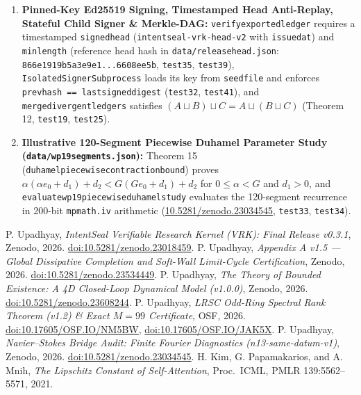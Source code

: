 \documentclass[10pt,letterpaper]{article}
\renewcommand{\_}{\textunderscore\allowbreak{}}
\begin{document}
\begin{enumerate}
  \item \textbf{Pinned-Key Ed25519 Signing, Timestamped Head Anti-Replay, Stateful Child Signer \& Merkle-DAG:} \texttt{verify\_exported\_ledger} requires a timestamped \texttt{signed\_head} (\texttt{intentseal-vrk-head-v2} with \texttt{issued\_at}) and \texttt{min\_length} (reference head hash in \texttt{data/release\_head.json}: \texttt{866e1919b5a3e9e1...6608ee5b}, \texttt{test\_35}, \texttt{test\_39}), \texttt{IsolatedSignerSubprocess} loads its key from \texttt{seed\_file} and enforces \texttt{prev\_hash == last\_signed\_digest} (\texttt{test\_32}, \texttt{test\_41}), and \texttt{merge\_divergent\_ledgers} satisfies $(A \sqcup B) \sqcup C = A \sqcup (B \sqcup C)$ (Theorem 12, \texttt{test\_19}, \texttt{test\_25}).
  \item \textbf{Illustrative 120-Segment Piecewise Duhamel Parameter Study (\texttt{data/wp19\_segments.json}):} Theorem 15 (\texttt{duhamel\_piecewise\_contraction\_bound}) proves $\alpha(\alpha e_0 + d_1) + d_2 < G(G e_0 + d_1) + d_2$ for $0 \le \alpha < G$ and $d_1 > 0$, and \texttt{evaluate\_wp19\_piecewise\_duhamel\_study} evaluates the 120-segment recurrence in 200-bit \texttt{mpmath.iv} arithmetic (\href{https://doi.org/10.5281/zenodo.23034545}{10.5281/zenodo.23034545}, \texttt{test\_33}, \texttt{test\_34}).
\end{enumerate}

\vspace{-0.5em}
\begin{thebibliography}{9}
\footnotesize
\setlength{\itemsep}{0.5pt}
 P. Upadhyay, \textit{IntentSeal Verifiable Research Kernel (VRK): Final Release v0.3.1}, Zenodo, 2026. \href{https://doi.org/10.5281/zenodo.23018459}{doi:10.5281/zenodo.23018459}.
 P. Upadhyay, \textit{Appendix A v1.5 --- Global Dissipative Completion and Soft-Wall Limit-Cycle Certification}, Zenodo, 2026. \href{https://doi.org/10.5281/zenodo.23534449}{doi:10.5281/zenodo.23534449}.
 P. Upadhyay, \textit{The Theory of Bounded Existence: A 4D Closed-Loop Dynamical Model (v1.0.0)}, Zenodo, 2026. \href{https://doi.org/10.5281/zenodo.23608244}{doi:10.5281/zenodo.23608244}.
 P. Upadhyay, \textit{LRSC Odd-Ring Spectral Rank Theorem (v1.2) \& Exact $M=99$ Certificate}, OSF, 2026. \href{https://doi.org/10.17605/OSF.IO/NM5BW}{doi:10.17605/OSF.IO/NM5BW}, \href{https://doi.org/10.17605/OSF.IO/JAK5X}{doi:10.17605/OSF.IO/JAK5X}.
 P. Upadhyay, \textit{Navier--Stokes Bridge Audit: Finite Fourier Diagnostics (n13-same-datum-v1)}, Zenodo, 2026. \href{https://doi.org/10.5281/zenodo.23034545}{doi:10.5281/zenodo.23034545}.
 H. Kim, G. Papamakarios, and A. Mnih, \textit{The Lipschitz Constant of Self-Attention}, Proc.\ ICML, PMLR 139:5562--5571, 2021.
\end{thebibliography}
\end{document}

